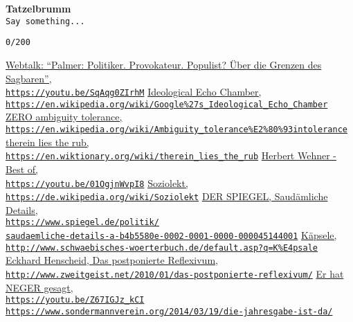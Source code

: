 \documentclass[a4,parindent=0pt]{article}
\begin{document}
\textbf{Tatzelbrumm}\\
\texttt{Say\ something...}

\texttt{0/200}

\begin{thebibliography}{88}
  \href{https://youtu.be/SqAqg0ZIrhM}{Webtalk: ``Palmer: Politiker.
  Provokateur. Populist? Über die Grenzen des Sagbaren'',\\
\texttt{https://youtu.be/SqAqg0ZIrhM}}
  \href{https://en.wikipedia.org/wiki/Google\%27s_Ideological_Echo_Chamber}{Ideological
  Echo Chamber,\\
\texttt{https://en.wikipedia.org/wiki/Google\%27s\_Ideological\_Echo\_Chamber}}
  \href{https://en.wikipedia.org/wiki/Ambiguity_tolerance\%E2\%80\%93intolerance}{ZERO
  ambiguity tolerance,\\
\texttt{https://en.wikipedia.org/wiki/Ambiguity\_tolerance\%E2\%80\%93intolerance}}
  \href{https://en.wiktionary.org/wiki/therein_lies_the_rub}{therein
  lies the rub,\\
\texttt{https://en.wiktionary.org/wiki/therein\_lies\_the\_rub}}
  \href{https://youtu.be/01OgjnWvpI8}{Herbert Wehner - Best of,\\
\texttt{https://youtu.be/01OgjnWvpI8}}
  \href{https://de.wikipedia.org/wiki/Soziolekt}{Soziolekt,\\
\texttt{https://de.wikipedia.org/wiki/Soziolekt}}
  \href{https://www.spiegel.de/politik/saudaemliche-details-a-b4b5580e-0002-0001-0000-000045144001}{DER SPIEGEL, Saudämliche
  Details,\\
\texttt{https://www.spiegel.de/politik/\\saudaemliche-details-a-b4b5580e-0002-0001-0000-000045144001}}
  \href{http://www.schwaebisches-woerterbuch.de/default.asp?q=K\%E4psale}{Käpsele,\\
\texttt{http://www.schwaebisches-woerterbuch.de/default.asp?q=K\%E4psale}}
  \href{http://www.zweitgeist.net/2010/01/das-postponierte-reflexivum/}{Eckhard Henscheid, Das
  postponierte Reflexivum,\\
\texttt{http://www.zweitgeist.net/2010/01/das-postponierte-reflexivum/}}
  \href{https://youtu.be/Z67IGJz_kCI}{Er hat NEGER gesagt,\\
\texttt{https://youtu.be/Z67IGJz\_kCI}}
  \href{https://www.sondermannverein.org/2014/03/19/die-jahresgabe-ist-da/}{\texttt{https://www.sondermannverein.org/2014/03/19/die-jahresgabe-ist-da/}}

\end{thebibliography}
\end{document}

